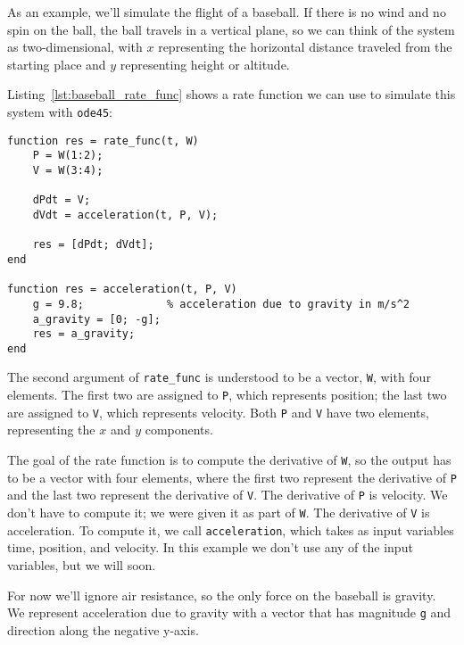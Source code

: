 As an example, we'll simulate the flight of a baseball.
If there is no wind and no spin on the ball, the ball travels in a vertical plane, so we can think of the system as two-dimensional, with $x$ representing the horizontal distance
traveled from the starting place and $y$ representing height or altitude.


Listing~\ref{lst:baseball_rate_func} shows a rate function we can use to simulate this system with \lstinline{ode45}:

\begin{lstlisting}[caption={A rate function we can use to model the flight of a baseball}, label={lst:baseball_rate_func}]
function res = rate_func(t, W)
    P = W(1:2);
    V = W(3:4);

    dPdt = V;
    dVdt = acceleration(t, P, V);

    res = [dPdt; dVdt];
end

function res = acceleration(t, P, V)
    g = 9.8;             % acceleration due to gravity in m/s^2
    a_gravity = [0; -g];
    res = a_gravity;
end
\end{lstlisting}

The second argument of \lstinline{rate_func} is understood to be a vector,
\lstinline{W}, with four elements.  The first two are assigned to \lstinline{P},
which represents position; the last two are assigned to \lstinline{V}, which
represents velocity. Both \lstinline{P} and \lstinline{V} have two elements,
representing the $x$ and $y$ components.


The goal of the rate function is to compute the derivative of \lstinline{W}, so the output has to be a vector with four elements, where the first two represent the derivative of \lstinline{P}  and the last two represent the derivative of \lstinline{V}.
The derivative of \lstinline{P} is velocity.  We don't have to compute it; we were given it as part of \lstinline{W}.
The derivative of \lstinline{V} is acceleration.  To compute it, we call \lstinline{acceleration}, which takes as input variables time, position, and velocity.  In this example we don't use any of the input variables, but we will soon.


For now we'll ignore air resistance, so the only force on the baseball is gravity.  We represent acceleration due to gravity with a vector that has magnitude \lstinline{g} and direction along the negative y-axis.


